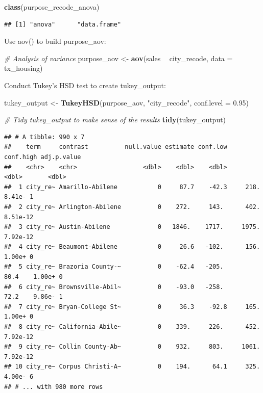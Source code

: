 \documentclass[]{book}
\newenvironment{Shaded}{\begin{snugshade}}{\end{snugshade}}
\newcommand{\CommentTok}[1]{\textcolor[rgb]{0.56,0.35,0.01}{\textit{#1}}}
\newcommand{\DataTypeTok}[1]{\textcolor[rgb]{0.13,0.29,0.53}{#1}}
\newcommand{\FloatTok}[1]{\textcolor[rgb]{0.00,0.00,0.81}{#1}}
\newcommand{\KeywordTok}[1]{\textcolor[rgb]{0.13,0.29,0.53}{\textbf{#1}}}
\newcommand{\NormalTok}[1]{#1}
\newcommand{\OperatorTok}[1]{\textcolor[rgb]{0.81,0.36,0.00}{\textbf{#1}}}
\newcommand{\StringTok}[1]{\textcolor[rgb]{0.31,0.60,0.02}{#1}}
\begin{document}
\begin{Shaded}
\begin{Highlighting}[]
\KeywordTok{class}\NormalTok{(purpose_recode_anova)}
\end{Highlighting}
\end{Shaded}

\begin{verbatim}
## [1] "anova"      "data.frame"
\end{verbatim}

Use aov() to build purpose\_aov:

\begin{Shaded}
\begin{Highlighting}[]
\CommentTok{# Analysis of variance}
\NormalTok{purpose_aov <-}\StringTok{ }\KeywordTok{aov}\NormalTok{(sales }\OperatorTok{~}\StringTok{ }\NormalTok{city_recode, }\DataTypeTok{data =}\NormalTok{ tx_housing)}
\end{Highlighting}
\end{Shaded}

Conduct Tukey's HSD test to create tukey\_output:

\begin{Shaded}
\begin{Highlighting}[]
\NormalTok{tukey_output <-}\StringTok{ }\KeywordTok{TukeyHSD}\NormalTok{(purpose_aov, }\StringTok{"city_recode"}\NormalTok{, }\DataTypeTok{conf.level =} \FloatTok{0.95}\NormalTok{)}

\CommentTok{# Tidy tukey_output to make sense of the results}
\KeywordTok{tidy}\NormalTok{(tukey_output)}
\end{Highlighting}
\end{Shaded}

\begin{verbatim}
## # A tibble: 990 x 7
##    term     contrast          null.value estimate conf.low conf.high adj.p.value
##    <chr>    <chr>                  <dbl>    <dbl>    <dbl>     <dbl>       <dbl>
##  1 city_re~ Amarillo-Abilene           0     87.7    -42.3     218.     8.41e- 1
##  2 city_re~ Arlington-Abilene          0    272.     143.      402.     8.51e-12
##  3 city_re~ Austin-Abilene             0   1846.    1717.     1975.     7.92e-12
##  4 city_re~ Beaumont-Abilene           0     26.6   -102.      156.     1.00e+ 0
##  5 city_re~ Brazoria County-~          0    -62.4   -205.       80.4    1.00e+ 0
##  6 city_re~ Brownsville-Abil~          0    -93.0   -258.       72.2    9.86e- 1
##  7 city_re~ Bryan-College St~          0     36.3    -92.8     165.     1.00e+ 0
##  8 city_re~ California-Abile~          0    339.     226.      452.     7.92e-12
##  9 city_re~ Collin County-Ab~          0    932.     803.     1061.     7.92e-12
## 10 city_re~ Corpus Christi-A~          0    194.      64.1     325.     4.00e- 6
## # ... with 980 more rows
\end{verbatim}
\end{document}
